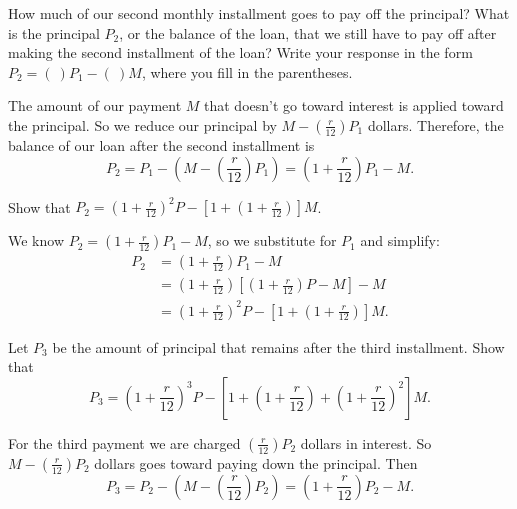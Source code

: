 \begin{exercises}
    \item How much of our second monthly installment goes to pay off the principal? What is the principal $P_2$, or the balance of the loan, that we still have to pay off after making the second installment of the loan? Write your response in the form $P_2 = ( \ )P_1 - ( \ )M$, where you fill in the parentheses.

\begin{exerciseSolution}
\vs
The amount of our payment $M$ that doesn't go toward interest is applied toward the principal. So we reduce our principal by $M-\left(\frac{r}{12}\right)P_1$ dollars. Therefore, the balance of our loan after the second installment is
\[P_2 = P_1 - \left( M - \left(\frac{r}{12}\right)P_1 \right) = \left(1 + \frac{r}{12}\right)P_1 - M.\]

\vs
\end{exerciseSolution}
	
    \item Show that $P_2 = \left(1 + \frac{r}{12}\right)^2P - \left[1 + \left(1+\frac{r}{12}\right)\right] M$.

\begin{exerciseSolution}
\vs

We know $P_2 = \left(1 + \frac{r}{12}\right)P_1 - M$, so we substitute for $P_1$ and simplify:
\begin{align*}
P_2 &= \left(1 + \frac{r}{12}\right)P_1 - M \\
	&= \left(1 + \frac{r}{12}\right)\left[\left(1+\frac{r}{12}\right)P - M\right] - M \\
	&= \left(1 + \frac{r}{12}\right)^2P - \left[1 + \left(1+\frac{r}{12}\right)\right] M.
\end{align*}

\vs
\end{exerciseSolution}

    \item Let $P_3$ be the amount of principal that remains after the third installment. Show that
\[P_3 = \left(1 + \frac{r}{12}\right)^3P - \left[1 + \left(1+\frac{r}{12}\right) + \left(1+\frac{r}{12}\right)^2 \right] M.\]

\begin{exerciseSolution}
\vs

For the third payment we are charged $\left(\frac{r}{12}\right)P_2$ dollars in interest. So $M-\left(\frac{r}{12}\right)P_2$ dollars goes toward paying down the principal. Then
\[P_3 = P_2 - \left( M - \left(\frac{r}{12}\right)P_2 \right) = \left(1 + \frac{r}{12}\right)P_2 - M.\]


\end{exerciseSolution}
\end{exercises}

